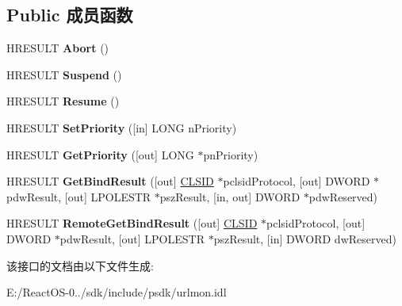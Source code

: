 \subsection*{Public 成员函数}
\begin{DoxyCompactItemize}
\item 
\mbox{\label{interface_i_binding_a09abc5153ee242a4e6b999e9cd9f18fd}} 
H\+R\+E\+S\+U\+LT {\bfseries Abort} ()
\item 
\mbox{\label{interface_i_binding_a9499ec5126796c3646aa6cc2733d29f5}} 
H\+R\+E\+S\+U\+LT {\bfseries Suspend} ()
\item 
\mbox{\label{interface_i_binding_a24af6517db6ffae73fd041665a6aa39e}} 
H\+R\+E\+S\+U\+LT {\bfseries Resume} ()
\item 
\mbox{\label{interface_i_binding_addce3d7c09209526609d114647e8174c}} 
H\+R\+E\+S\+U\+LT {\bfseries Set\+Priority} (\mbox{[}in\mbox{]} L\+O\+NG n\+Priority)
\item 
\mbox{\label{interface_i_binding_aced5378e11c081b8d41ccd3b64627dad}} 
H\+R\+E\+S\+U\+LT {\bfseries Get\+Priority} (\mbox{[}out\mbox{]} L\+O\+NG $\ast$pn\+Priority)
\item 
\mbox{\label{interface_i_binding_ae733b85c79e08110d5dd36bd6fc20db8}} 
H\+R\+E\+S\+U\+LT {\bfseries Get\+Bind\+Result} (\mbox{[}out\mbox{]} \hyperlink{struct___i_i_d}{C\+L\+S\+ID} $\ast$pclsid\+Protocol, \mbox{[}out\mbox{]} D\+W\+O\+RD $\ast$pdw\+Result, \mbox{[}out\mbox{]} L\+P\+O\+L\+E\+S\+TR $\ast$psz\+Result, \mbox{[}in, out\mbox{]} D\+W\+O\+RD $\ast$pdw\+Reserved)
\item 
\mbox{\label{interface_i_binding_adac0fbe418f34d6e301d348e35d7768e}} 
H\+R\+E\+S\+U\+LT {\bfseries Remote\+Get\+Bind\+Result} (\mbox{[}out\mbox{]} \hyperlink{struct___i_i_d}{C\+L\+S\+ID} $\ast$pclsid\+Protocol, \mbox{[}out\mbox{]} D\+W\+O\+RD $\ast$pdw\+Result, \mbox{[}out\mbox{]} L\+P\+O\+L\+E\+S\+TR $\ast$psz\+Result, \mbox{[}in\mbox{]} D\+W\+O\+RD dw\+Reserved)
\end{DoxyCompactItemize}


该接口的文档由以下文件生成\+:\begin{DoxyCompactItemize}
\item 
E\+:/\+React\+O\+S-\/0../sdk/include/psdk/urlmon.\+idl\end{DoxyCompactItemize}
